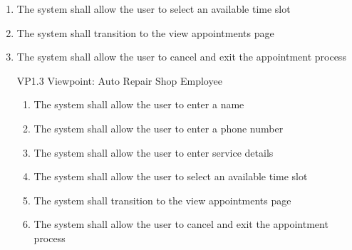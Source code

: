 \documentclass[12pt]{article}
\begin{document}
\begin{enumerate}
\begin{enumerate}
\begin{enumerate}
			            \item The system shall allow the user to select an available time slot
			            \item The system shall transition to the view appointments page
			            \item The system shall allow the user to cancel and exit the appointment process
		            \end{enumerate}
	      \end{enumerate}
	      \begin{enumerate}
		      \item [{VP1}.3] Viewpoint: Auto Repair Shop Employee
		            \begin{enumerate}
			            \item The system shall allow the user to enter a name
			            \item The system shall allow the user to enter a phone number
			            \item The system shall allow the user to enter service details
			            \item The system shall allow the user to select an available time slot
			            \item The system shall transition to the view appointments page
			            \item The system shall allow the user to cancel and exit the appointment process
		            \end{enumerate}
	      \end{enumerate}
\end{enumerate}
\end{document}

